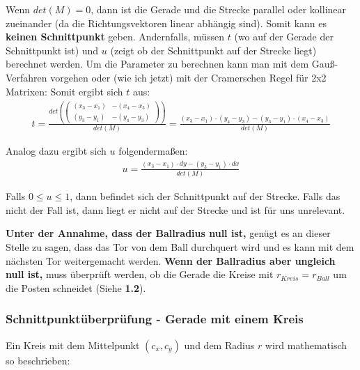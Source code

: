 \documentclass[a4paper,10pt,ngerman]{scrartcl}
\begin{document}
\begin{itemize}
  Wenn $det(M) = 0$, dann ist die Gerade und die Strecke parallel  oder kollinear zueinander (da die Richtungsvektoren linear abhängig sind). Somit kann es \textbf{keinen Schnittpunkt} geben.
  \newline
  Andernfalls, müssen $t$ (wo auf der Gerade der Schnittpunkt ist) und $u$ (zeigt ob der Schnittpunkt auf der Strecke liegt) berechnet werden.
  \newline
  Um die Parameter zu berechnen kann man mit dem Gauß-Verfahren vorgehen oder (wie ich jetzt) mit der Cramerschen Regel für 2x2 Matrixen:
  \newline
  \newline
  Somit ergibt sich $t$ aus:
  \begin{align*}
    t = 
    \frac{
      det(
        \begin{pmatrix}
          (x_{3} - x_{1}) & -(x_{4} - x_{3})\\
          (y_{3} - y_{1}) & -(y_{4} - y_{3})
        \end{pmatrix}
      )
    }{
      det(M)
    }
    = \frac{(x_{3}- x_{1}) \cdot (y_{4}- y_{3}) - (y_{3} - y_{1}) \cdot (x_{4} - x_{3})}{det(M)}
  \end{align*}

  Analog dazu ergibt sich $u$ folgendermaßen:
  \begin{align*}
    u = \frac{(x_{3}- x_{1}) \cdot dy - (y_{3} - y_{1}) \cdot dx}{det(M)}
  \end{align*}

  Falls $0 \leq u \leq 1$, dann befindet sich der Schnittpunkt auf der Strecke. Falls das nicht der Fall ist, dann liegt er nicht auf der Strecke und ist für uns unrelevant.

  \textbf{Unter der Annahme, dass der Ballradius null ist,} genügt es an dieser Stelle zu sagen, dass das Tor von dem Ball durchquert wird und es kann mit dem nächsten Tor weitergemacht werden.
  \newline
  \newline 
  \textbf{Wenn der Ballradius aber ungleich null ist,} muss überprüft werden, ob die Gerade die Kreise  mit $r_{Kreis} = r_{Ball}$ um die Posten schneidet (Siehe \textbf{1.2}).

  \subsubsection{Schnittpunktüberprüfung - Gerade mit einem Kreis}

  Ein Kreis mit dem Mittelpunkt $(c_{x}, c_{y})$ und dem Radius $r$ wird mathematisch so beschrieben:


\end{itemize}
\end{document}
